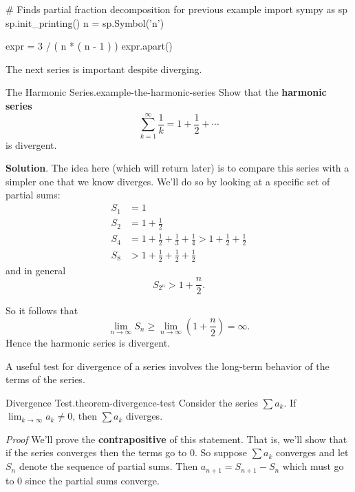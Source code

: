 \documentclass[10pt,]{book}
\makeatletter
\newcommand{\terminology}[1]{\textbf{#1}}
\renewcommand*{\proofname}{Proof}
\renewenvironment{proof}[1][\proofname]{\par
  \pushQED{\qed}%
  \normalfont \topsep6\p@\@plus6\p@\relax
  \trivlist
  \item\relax
    {\itshape
    #1\@addpunct{.}}\hspace\labelsep\ignorespaces
}{%
  \popQED\endtrivlist\@endpefalse
}
\numberwithin{equation}{section}
\newcommand{\gt}{>}
\newcommand{\amp}{&}
\makeatother
\begin{document}
\begin{sageinput}
# Finds partial fraction decomposition for previous example
import sympy as sp
sp.init_printing()
n = sp.Symbol('n')

expr = 3 / ( n * ( n - 1 ) )
expr.apart()
\end{sageinput}
\hypertarget{p-859}{}%
The next series is important despite diverging.%
\begin{example}{The Harmonic Series.}{example-the-harmonic-series}%
\hypertarget{p-860}{}%
Show that the \terminology{harmonic series}%
\begin{equation*}
\sum_{k=1}^{\infty}\frac{1}{k} = 1 + \frac{1}{2} + \cdots
\end{equation*}
is divergent.%
\par\smallskip%
\noindent\textbf{Solution}.\hypertarget{solution-179}{}\quad%
\hypertarget{p-861}{}%
The idea here (which will return later) is to compare this series with a simpler one that we know diverges. We'll do so by looking at a specific set of partial sums:%
\begin{align*}
S_{1} \amp = 1 \\
S_{2} \amp = 1 + \frac{1}{2} \\
S_{4} \amp = 1 + \frac{1}{2} + \frac{1}{3} + \frac{1}{4} \gt 1 + \frac{1}{2} + \frac{1}{2} \\
S_{8} \amp \gt 1 + \frac{1}{2} + \frac{1}{2} + \frac{1}{2} 
\end{align*}
and in general%
\begin{equation*}
S_{2^{n}} \gt 1 + \frac{n}{2}\text{.}
\end{equation*}
%
\par
\hypertarget{p-862}{}%
So it follows that%
\begin{equation*}
\lim_{n\to\infty}S_{n} \geq \lim_{n\to\infty}\left(1 + \frac{n}{2}\right) = \infty\text{.}
\end{equation*}
Hence the harmonic series is divergent.%
\end{example}
\hypertarget{p-863}{}%
A useful test for divergence of a series involves the long-term behavior of the terms of the series.%
\begin{theorem}{Divergence Test.}{}{theorem-divergence-test}%
\hypertarget{p-864}{}%
Consider the series \(\sum a_{k}\). If \(\lim_{k\to\infty}a_{k}\neq0\), then \(\sum a_{k}\) diverges.%
\end{theorem}
\begin{proof}\hypertarget{proof-13}{}
\hypertarget{p-865}{}%
We'll prove the \terminology{contrapositive} of this statement. That is, we'll show that if the series converges then the terms go to \(0\). So suppose \(\sum a_{k}\) converges and let \(S_{n}\) denote the sequence of partial sums. Then \(a_{n+1} = S_{n+1} - S_{n}\) which must go to \(0\) since the partial sums converge.%
\end{proof}
\end{document}
